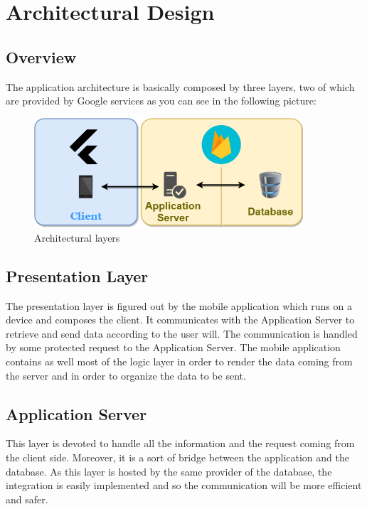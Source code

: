 \chapter{Architectural Design}

\section{Overview}
	The application architecture is basically composed by three layers, two of which are provided by Google services as you can see in the following picture:

	\begin{figure}[H]
		\begin{center}
			\includegraphics[width=10cm]{img/CookingTime_Architecture.png}
			\caption{Architectural layers}
			\label{Fig:ArchitecturalLayers}
		\end{center}
	\end{figure}

\section{Presentation Layer}
	The presentation layer is figured out by the mobile application which runs on a device and composes the client. 
	It communicates with the Application Server to retrieve and send data according to the user will. 
	The communication is handled by some protected request to the Application Server. 
	The mobile application contains as well most of the logic layer in order to render the data coming from the server and in order to organize the data to be sent.

\section{Application Server}
	This layer is devoted to handle all the information and the request coming from the client side. 
	Moreover, it is a sort of bridge between the application and the database. 
	As this layer is hosted by the same provider of the database, the integration is easily implemented and so the communication will be more efficient and safer.

